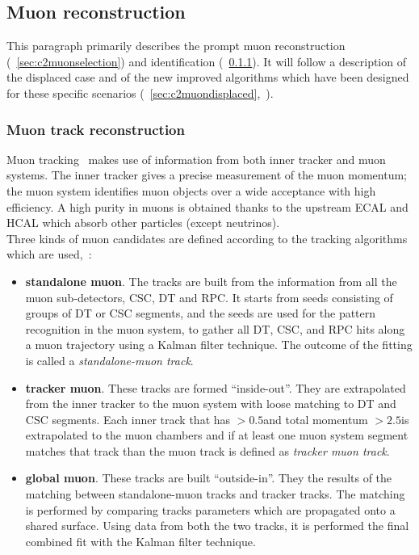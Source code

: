 \subsection{Muon reconstruction}\label{sec:trackmuon}
This paragraph primarily describes the prompt muon reconstruction (~\ref{sec:c2muonselection}) and
identification (~\ref{sec:c2muonreco}). It will follow a description of the displaced
case and of the new improved algorithms which have been designed for these specific
scenarios (~\ref{sec:c2muondisplaced},~\cite{CMS-DP-2015-015}).

\subsubsection{Muon track reconstruction}\label{sec:c2muonreco}
Muon tracking~\cite{collaboration_2013,Sirunyan_2018_muon} makes use of information from
both inner tracker and muon systems. The
inner tracker gives a precise measurement of the muon momentum; the
muon system identifies muon objects over a wide acceptance with high efficiency. A high purity in muons is obtained
thanks to the upstream ECAL and HCAL which absorb other particles
(except neutrinos). \\
Three kinds of muon
candidates are defined according to the tracking algorithms which are used,~\cite{Sirunyan_2018_muon}:
\begin{itemize}
\setlength\itemsep{-0.2em}
\item \textbf{standalone muon}. The tracks are built from the
  information from all the muon sub-detectors, CSC, DT and RPC. It
  starts from seeds consisting of groups of DT or CSC segments, and
  the seeds are used for the pattern recognition in the muon system, to
gather all DT, CSC, and RPC hits along a muon trajectory using a
Kalman filter technique. The outcome of the fitting is called a
\emph{standalone-muon track}.
\item \textbf{tracker muon}. These tracks are formed
  ``inside-out''. They are extrapolated from the inner
  tracker to the muon system with loose matching to DT and CSC
  segments. Each inner track that has \pt$>0.5$\GeV and total
  momentum $>2.5$\GeV is extrapolated to the muon chambers and if at
  least one muon system segment matches that track than the muon track is defined as \emph{tracker
  muon track}. 
\item \textbf{global muon}. These tracks are built
  ``outside-in''. They the results of the matching between
  standalone-muon tracks and tracker tracks. The matching is performed by
  comparing tracks parameters which are propagated onto a shared
  surface. Using data from both the two tracks, it is performed the final combined fit with the Kalman filter technique.
\end{itemize}

